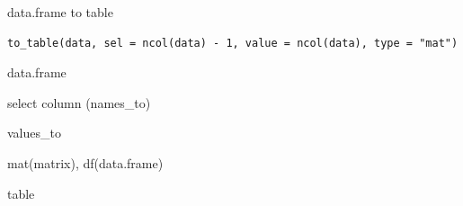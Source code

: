\documentclass[a4paper]{book}
\begin{document}
%
\begin{Description}
data.frame to table
\end{Description}
%
\begin{Usage}
\begin{verbatim}
to_table(data, sel = ncol(data) - 1, value = ncol(data), type = "mat")
\end{verbatim}
\end{Usage}
%
\begin{Arguments}
\begin{ldescription}
\item[\code{data}] data.frame

\item[\code{sel}] select column (names\_to)

\item[\code{value}] values\_to

\item[\code{type}] mat(matrix), df(data.frame)
\end{ldescription}
\end{Arguments}
%
\begin{Value}
table
\end{Value}
%
\end{document}
